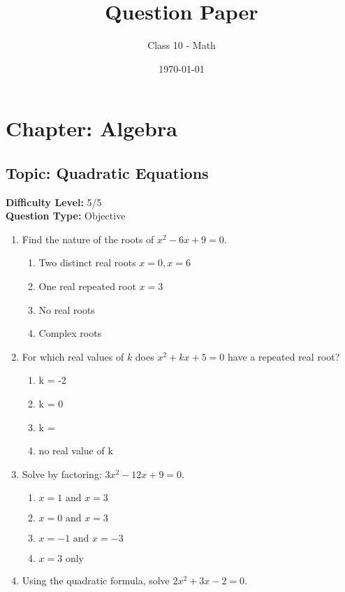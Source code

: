 \documentclass[12pt]{article}
\title{Question Paper}
\author{Class 10 - Math}
\date{\today}
\begin{document}
\maketitle

\section*{Chapter: Algebra}
\subsection*{Topic: Quadratic Equations}
\textbf{Difficulty Level:} 5/5 \\
\textbf{Question Type:} Objective

\begin{enumerate}

\item Find the nature of the roots of \(x^2 - 6x + 9 = 0\).

\begin{enumerate}
  \item Two distinct real roots \(x = 0, x = 6\)
  \item One real repeated root \(x = 3\)
  \item No real roots
  \item Complex roots
\end{enumerate}

\item For which real values of \(k\) does \(x^2 + kx + 5 = 0\) have a repeated real root?

\begin{enumerate}
  \item k = -2
  \item k = 0
  \item k = 
  \item no real value of k
\end{enumerate}

\item Solve by factoring: \(3x^2 - 12x + 9 = 0\).

\begin{enumerate}
  \item \(x = 1\text{ and }x = 3\)
  \item \(x = 0\text{ and }x = 3\)
  \item \(x = -1\text{ and }x = -3\)
  \item \(x = 3\text{ only}\)
\end{enumerate}

\item Using the quadratic formula, solve \(2x^2 + 3x - 2 = 0\).


\end{enumerate}
\end{document}
